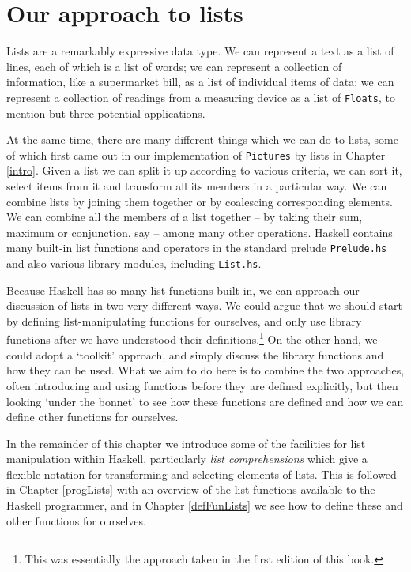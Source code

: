 

\section{Our approach to lists}


Lists are a remarkably expressive data type. We can represent a text as
a list of lines, each of which is a list of words; we can represent a
collection of information, like a supermarket bill, as a list of
individual items of data; we can represent a collection of readings from
a measuring device as a list of \texttt{Floats}, to mention but three
potential applications. 

At the same time, there are many different things which we can
do to lists, some of which first came out in our implementation of \texttt{Pictures}
by lists
in Chapter \ref{intro}. Given a list we can split it up according to
various criteria, we can sort it, select items from it and transform all
its members in a particular way. We can combine lists by joining them
together or by coalescing corresponding elements. We can combine all
the members of a list together -- by taking their sum, maximum or
conjunction, say -- among many other operations. 
Haskell contains many built-in list functions
and operators in the standard prelude \texttt{Prelude.hs}
and also various library modules, including
\texttt{List.hs}. 

Because Haskell has so many list functions built in, we can approach our discussion of
lists in two very different ways. We could argue that we should start by 
defining list-manipulating functions for ourselves, and only use library
functions after we have understood their definitions.\footnote{This was
essentially the approach taken in the first edition of this book.} On
the other hand, we could adopt a `toolkit' approach, and simply discuss
the library functions and how they can be used. What we aim to do here
is to combine the two approaches, often introducing and using functions
before they are defined explicitly, but then looking `under the bonnet' to see
how these functions are defined  and how we can define other functions
for ourselves. 


In the remainder of this chapter we introduce some of the facilities for
list manipulation within Haskell, particularly \emph{list comprehensions} which give a flexible notation for transforming and selecting elements of lists. This is followed in Chapter \ref{progLists} with an overview of the list functions available to the Haskell programmer, and in Chapter \ref{defFunLists} we see how to define these and
other functions for ourselves.




